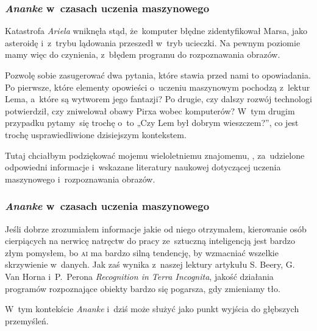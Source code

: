 \documentclass[10pt,t]{beamer}
\begin{document}
\begin{frame}
  \frametitle{\textit{Ananke} w~czasach uczenia maszynowego}


  Katastrofa \textit{Ariela} wniknęła stąd, że~komputer błędne
  zidentyfikował Marsa, jako asteroidę i~z~trybu lądowania przeszedł
  w~tryb ucieczki. Na pewnym poziomie mamy więc do czynienia, z~błędem
  programu do rozpoznawania obrazów.

  Pozwolę sobie zasugerować dwa pytania, które stawia przed nami to
  opowiadania. Po pierwsze, które elementy opowieści o~uczeniu maszynowym
  pochodzą z~lektur Lema, a~które są wytworem jego fantazji? Po drugie,
  czy dalszy rozwój technologi potwierdził, czy zniwelował obawy Pirxa
  wobec komputerów? W~tym drugim przypadku pytamy~się trochę o~to „Czy
  Lem był dobrym wieszczem?”, co jest trochę usprawiedliwione dzisiejszym
  kontekstem.

  Tutaj chciałbym podziękować mojemu wieloletniemu znajomemu,
  ,
  za~udzielone odpowiedni informacje i~wskazane literatury naukowej
  dotyczącej uczenia maszynowego i~rozpoznawania obrazów.

\end{frame}





\begin{frame}
  \frametitle{\textit{Ananke} w~czasach uczenia maszynowego}


  Jeśli dobrze zrozumiałem informacje jakie od niego otrzymałem,
  kierowanie osób cierpiących na nerwicę natręctw do pracy ze~sztuczną
  inteligencją jest bardzo złym pomysłem, bo \textsc{ai} ma bardzo silną
  tendencję, by wzmacniać wszelkie skrzywienie w~danych. Jak zaś wynika
  z~naszej lektury artykułu S. Beery, G. Van Horna i~P.~Perona
  \textit{Recognition in Terra Incognita}, jakość działania programów
  rozpoznające obiekty bardzo się pogarsza, gdy zmieniamy tło.

  W~tym kontekście \textit{Ananke} i~dziś może służyć jako punkt wyjścia
  do głębszych przemyśleń.

\end{frame}
\end{document}
